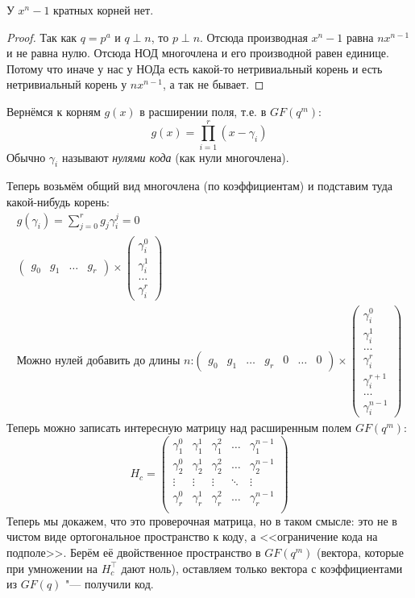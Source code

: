 \begin{lemma}
	У $x^n-1$ кратных корней нет.
\end{lemma}
\begin{proof}
	Так как $q=p^a$ и $q \perp n$, то $p \perp n$.
	Отсюда производная $x^n-1$ равна $nx^{n-1}$ и не равна нулю.
	Отсюда НОД многочлена и его производной равен единице.
	Потому что иначе у нас у НОДа есть какой-то нетривиальный корень
	и есть нетривиальный корень у $nx^{n-1}$, а так не бывает.
\end{proof}

Вернёмся к корням $g(x)$ в расширении поля, т.е. в $GF(q^m)$:
\[
g(x) = \prod\limits_{i=1}^r (x-\gamma_i)
\]
Обычно $\gamma_i$ называют \textit{нулями кода} (как нули многочлена).

Теперь возьмём общий вид многочлена (по коэффициентам) и подставим туда какой-нибудь корень:
\begin{gather*}
g(\gamma_i) = \sum\limits_{j=0}^r g_j \gamma_i^j = 0
\\
\begin{pmatrix}
g_0 & g_1 & \dots & g_r
\end{pmatrix}
\times
\begin{pmatrix}
\gamma_i^0 \\ \gamma_i^1 \\ \dots \\ \gamma_i^r
\end{pmatrix}
\\
\text{Можно нулей добавить до длины $n$:}
\begin{pmatrix}
g_0 & g_1 & \dots & g_r & 0 & \dots & 0
\end{pmatrix}
\times
\begin{pmatrix}
\gamma_i^0 \\ \gamma_i^1 \\ \dots \\ \gamma_i^r \\ \gamma_i^{r+1} \\ \dots \\ \gamma_i^{n-1}
\end{pmatrix}
\end{gather*}
Теперь можно записать интересную матрицу над расширенным полем $GF(q^m)$:
\[
H_c = \begin{pmatrix}
\gamma_1^0 & \gamma_1^1 & \gamma_1^2 & \dots & \gamma_1^{n-1} \\
\gamma_2^0 & \gamma_2^1 & \gamma_2^2 & \dots & \gamma_2^{n-1} \\
\vdots & \vdots & \vdots & \ddots & \vdots \\
\gamma_r^0 & \gamma_r^1 & \gamma_r^2 & \dots & \gamma_r^{n-1} \\
\end{pmatrix}
\]
Теперь мы докажем, что это проверочная матрица, но в таком смысле:
это не в чистом виде ортогональное пространство к коду,
а <<ограничение кода на подполе>>.
Берём её двойственное пространство в $GF(q^m)$ (вектора, которые при умножении
на $H_c^\top$ дают ноль), оставляем только вектора с коэффициентами из $GF(q)$ "--- получили код.

